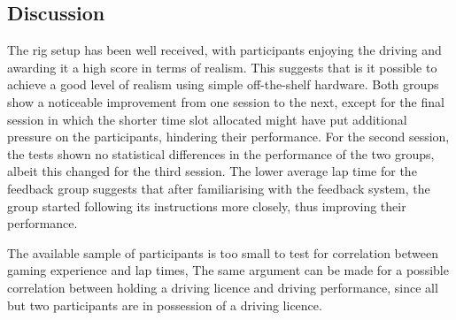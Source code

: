 \documentclass{sig-alternate}
\begin{document}
{\subsection{Discussion}
The rig setup has been well received, with participants enjoying the driving and awarding it a high score in terms of realism. This suggests that is it possible to achieve a good level of realism using simple off-the-shelf hardware. 
Both groups show a noticeable improvement from one session to the next, except for the final session in which the shorter time slot allocated might have put additional pressure on the participants, hindering their performance.
For the second session, the tests shown no statistical differences in the performance of the two groups, albeit this changed for the third session. The lower average lap time for the feedback group suggests that after familiarising with the feedback system, the group started following its instructions more closely, thus improving their performance.

The available sample of participants is too small to test for correlation between gaming experience and lap times, The same argument can be made for a possible correlation between holding a driving licence and driving performance, since all but two participants are in possession of a driving licence.
}
\end{document}
